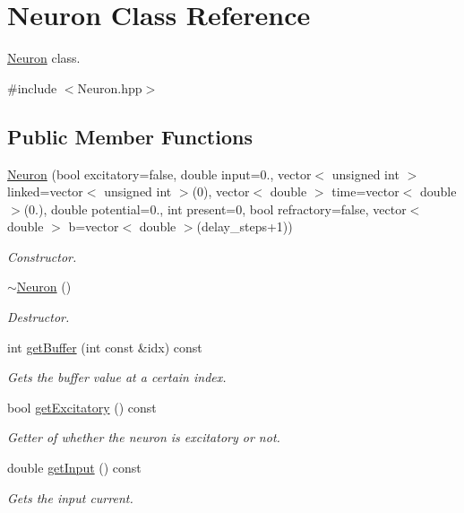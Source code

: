 \hypertarget{classNeuron}{\section{Neuron Class Reference}
\label{classNeuron}
}


\hyperlink{classNeuron}{Neuron} class.  




{\ttfamily \#include $<$Neuron.\-hpp$>$}

\subsection*{Public Member Functions}
\begin{DoxyCompactItemize}
\item 
\hyperlink{classNeuron_a3778933b884dea19411358a851a65ed2}{Neuron} (bool excitatory=false, double input=0., vector$<$ unsigned int $>$ linked=vector$<$ unsigned int $>$(0), vector$<$ double $>$ time=vector$<$ double $>$(0.), double potential=0., int present=0, bool refractory=false, vector$<$ double $>$ b=vector$<$ double $>$(delay\-\_\-steps+1))
\begin{DoxyCompactList}\small\item\em Constructor. \end{DoxyCompactList}\item 
\hyperlink{classNeuron_a94a250ce7e167760e593979b899745b1}{$\sim$\-Neuron} ()
\begin{DoxyCompactList}\small\item\em Destructor. \end{DoxyCompactList}\item 
int \hyperlink{classNeuron_ab7d4290b3d149f9b3bfb09b4e898e1d4}{get\-Buffer} (int const \&idx) const 
\begin{DoxyCompactList}\small\item\em Gets the buffer value at a certain index. \end{DoxyCompactList}\item 
bool \hyperlink{classNeuron_a185f67cb52f92805222fcef8e8236e43}{get\-Excitatory} () const 
\begin{DoxyCompactList}\small\item\em Getter of whether the neuron is excitatory or not. \end{DoxyCompactList}\item 
double \hyperlink{classNeuron_a9519b367ae5080ae9ed9c796685853f8}{get\-Input} () const 
\begin{DoxyCompactList}\small\item\em Gets the input current. \end{DoxyCompactList}\item 

\end{DoxyCompactItemize}
